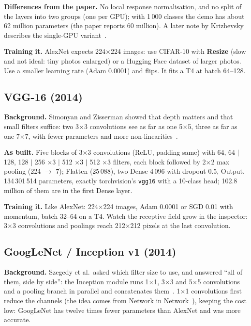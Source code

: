 \documentclass[11pt,a4paper]{article}
\newcommand{\ui}[1]{\textbf{\textsf{#1}}}
\begin{document}
\textbf{Differences from the paper.} No local response normalisation, and no split of the layers into two groups (one per GPU); with
1\,000 classes the demo has about 62 million parameters (the paper reports 60 million). A later note by Krizhevsky describes the single-GPU
variant~\cite{krizhevsky2014weird}.

\textbf{Training it.} AlexNet expects 224$\times$224 images: use CIFAR-10 with \ui{Resize} (slow and not ideal: tiny photos enlarged) or a
Hugging Face dataset of larger photos. Use a smaller learning rate (Adam 0.0001) and flips. It fits a T4 at batch 64--128.

\subsection{VGG-16 (2014)}
\textbf{Background.} Simonyan and Zisserman showed that depth matters and that small filters suffice: two 3$\times$3 convolutions see as
far as one 5$\times$5, three as far as one 7$\times$7, with fewer parameters and more non-linearities~\cite{simonyan2014vgg}.

\textbf{As built.} Five blocks of 3$\times$3 convolutions (ReLU, padding same) with 64, 64 $|$ 128, 128 $|$ 256 $\times$3 $|$ 512
$\times$3 $|$ 512 $\times$3 filters, each block followed by 2$\times$2 max pooling (224 $\rightarrow$ 7); Flatten (25\,088), two Dense
4\,096 with dropout 0.5, Output. 134\,301\,514 parameters, exactly torchvision's \texttt{vgg16} with a 10-class head; 102.8 million of them
are in the first Dense layer.

\textbf{Training it.} Like AlexNet: 224$\times$224 images, Adam 0.0001 or SGD 0.01 with momentum, batch 32--64 on a T4. Watch the
receptive field grow in the inspector: 3$\times$3 convolutions and poolings reach 212$\times$212 pixels at the last convolution.

\subsection{GoogLeNet / Inception v1 (2014)}
\textbf{Background.} Szegedy et al.\ asked which filter size to use, and answered ``all of them, side by side'': the Inception module
runs 1$\times$1, 3$\times$3 and 5$\times$5 convolutions and a pooling branch in parallel and concatenates them~\cite{szegedy2014going}.
1$\times$1 convolutions first reduce the channels (the idea comes from Network in Network~\cite{lin2013nin}), keeping the cost low:
GoogLeNet has twelve times fewer parameters than AlexNet and was more accurate.
\end{document}
